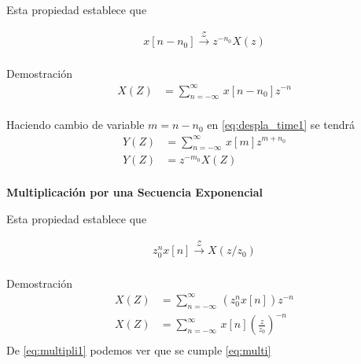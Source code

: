 \documentclass[12pt]{article}
\begin{document}
Esta propiedad establece que\par

\begin{equation}
    \begin{split}
        x[n-n_{0}]\xrightarrow{\mathscr{Z}}z^{-n_{0}}X(z)\\
    \end{split}
    \label{eq:despla_time}
\end{equation}

Demostración
\begin{equation}
    \begin{split}
        X(Z)&=\displaystyle\sum_{n=-\infty}^{\infty}\,x[n-n_{0}]z^{-n}\\
    \end{split}
    \label{eq:despla_time1}
\end{equation}

Haciendo cambio de variable $m=n-n_{0}$ en \ref{eq:despla_time1} se tendrá
\begin{equation}
    \begin{split}
        Y(Z)&=\displaystyle\sum_{n=-\infty}^{\infty}\,x[m]z^{m+n_{0}}\\
        Y(Z)&=z^{-m_{0}}X(Z)\\
    \end{split}
    \label{eq:despla_time2}
\end{equation}

\textbf{Multiplicación por una Secuencia Exponencial}
\vspace{5mm}

Esta propiedad establece que\par

\begin{equation}
    \begin{split}
        z^n_{0}x[n]\xrightarrow{\mathscr{Z}}X(z/z_{0})\\
    \end{split}
    \label{eq:multi}
\end{equation}

Demostración
\begin{equation}
    \begin{split}
        X(Z)&=\displaystyle\sum_{n=-\infty}^{\infty}\,(z^n_{0}x[n])z^{-n}\\
        X(Z)&=\displaystyle\sum_{n=-\infty}^{\infty}\,x[n](\frac{z}{z_{0}})^{-n}\\
    \end{split}
    \label{eq:multipli1}
\end{equation}
De \ref{eq:multipli1} podemos ver que se cumple \ref{eq:multi}
\end{document}
